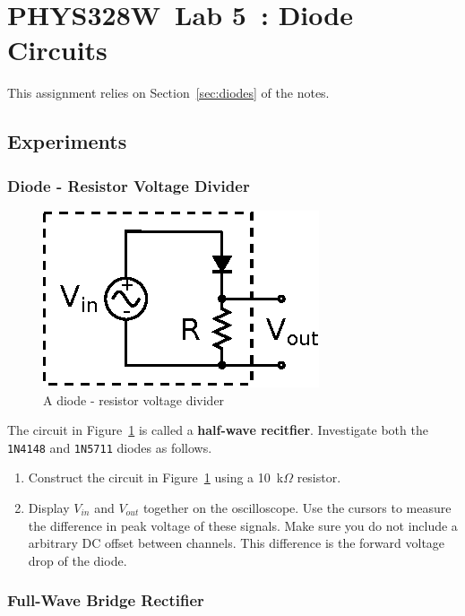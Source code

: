 \documentclass[11pt]{article}
\newcommand{\COURSE}{PHYS328W}
\newcommand{\LABNUM}{5}
\newcommand{\TITLE}{Diode Circuits}
\begin{document}
\thispagestyle{empty}

\section*{\COURSE\ Lab \LABNUM\ : \TITLE}

This assignment relies on Section~\ref{sec:diodes} of the notes.

\subsection*{Experiments}

\subsubsection*{Diode - Resistor Voltage Divider}

\begin{figure}[h]
\centering
\includegraphics{diodevdivider.eps}
\caption{A diode - resistor voltage divider}
\label{fig:diodevdivider}
\end{figure}
The circuit in Figure~\ref{fig:diodevdivider} is called a
\textbf{half-wave recitfier}.  Investigate both the \texttt{1N4148}
and \texttt{1N5711} diodes as follows.

\begin{enumerate}
\item Construct the circuit in Figure~\ref{fig:diodevdivider} using a
  10~k$\Omega$ resistor.
  
\item Display $V_{in}$ and $V_{out}$ together on the oscilloscope. Use
  the cursors to measure the difference in peak voltage of these
  signals. Make sure you do not include a arbitrary DC offset between
  channels. This difference is the forward voltage drop of the diode.
\end{enumerate}

\subsubsection*{Full-Wave Bridge Rectifier}
\end{document}
